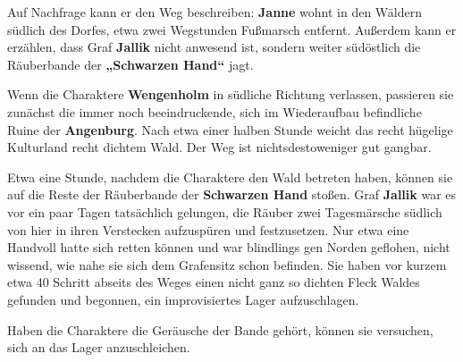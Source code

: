 
Auf Nachfrage kann er den Weg beschreiben: \textbf{Janne} wohnt in den Wäldern südlich des Dorfes, etwa zwei Wegstunden Fußmarsch entfernt.
Außerdem kann er erzählen, dass Graf \textbf{Jallik} nicht anwesend ist, sondern weiter südöstlich die Räuberbande der \textbf{„Schwarzen Hand“} jagt.


Wenn die Charaktere \textbf{Wengenholm} in südliche Richtung verlassen, passieren sie zunächst die immer noch beeindruckende, sich im Wiederaufbau befindliche Ruine der \textbf{Angenburg}.
Nach etwa einer halben Stunde weicht das recht hügelige Kulturland recht dichtem Wald.
Der Weg ist nichtsdestoweniger gut gangbar.

Etwa eine Stunde, nachdem die Charaktere den Wald betreten haben, können sie auf die Reste der Räuberbande der \textbf{Schwarzen Hand} stoßen.
Graf \textbf{Jallik} war es vor ein paar Tagen tatsächlich gelungen, die Räuber zwei Tagesmärsche südlich von hier in ihren Verstecken aufzuspüren und festzusetzen.
Nur etwa eine Handvoll hatte sich retten können und war blindlings gen Norden geflohen, nicht wissend, wie nahe sie sich dem Grafensitz schon befinden.
Sie haben vor kurzem etwa 40 Schritt abseits des Weges einen nicht ganz so dichten Fleck Waldes gefunden und begonnen, ein improvisiertes Lager aufzuschlagen.



\neuespalte

Haben die Charaktere die Geräusche der Bande gehört, können sie versuchen, sich an das Lager anzuschleichen. 

